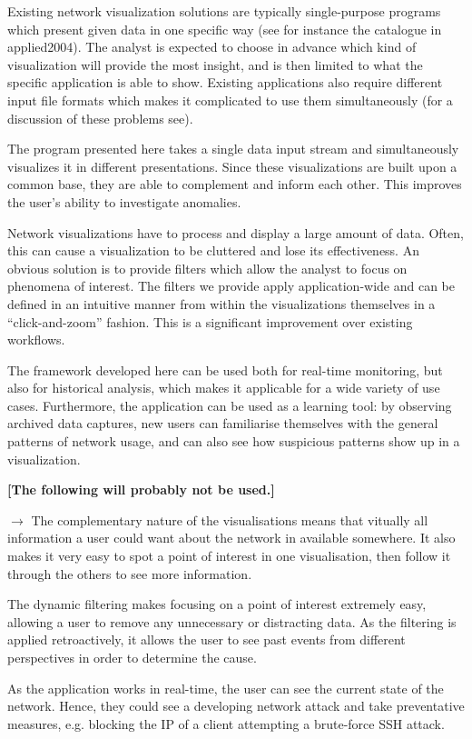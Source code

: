 Existing network visualization solutions are typically single-purpose programs which present given data in one specific way (see for instance the catalogue in  applied2004). The analyst is expected to choose in advance which kind of visualization will provide the most insight, and is then limited to what the specific application is able to show. Existing applications also require different input file formats which makes it complicated to use them simultaneously (for a discussion of these problems see). 

The program presented here takes a single data input stream and simultaneously visualizes it in different presentations. Since these visualizations are built upon a common base, they are able to complement and inform each other. This improves the user's ability to investigate anomalies.

Network visualizations have to process and display a large amount of data. Often, this can cause a visualization to be cluttered and lose its effectiveness. An obvious solution is to provide filters which allow the analyst to focus on phenomena of interest. The filters we provide apply application-wide and can be defined in an intuitive manner from within the visualizations themselves in a ``click-and-zoom'' fashion. This is a significant improvement over existing workflows.

The framework developed here can be used both for real-time monitoring, but also for historical analysis, which makes it applicable for a wide variety of use cases. Furthermore, the application can be used as a learning tool: by observing archived data captures, new users can familiarise themselves with the general patterns of network usage, and can also see how suspicious patterns show up in a visualization.

\textbf{[The following will probably not be used.]}

$\rightarrow$ The complementary nature of the visualisations means that vitually all information a user could want about the network in available somewhere.  It also makes it very easy to spot a point of interest in one visualisation, then follow it through the others to see more information.

The dynamic filtering makes focusing on a point of interest extremely easy, allowing a user to remove any unnecessary or distracting data.  As the filtering is applied retroactively, it allows the user to see past events from different perspectives in order to determine the cause.

As the application works in real-time, the user can see the current state of the network.  Hence, they could see a developing network attack and take preventative measures, e.g. blocking the IP of a client attempting a brute-force SSH attack.